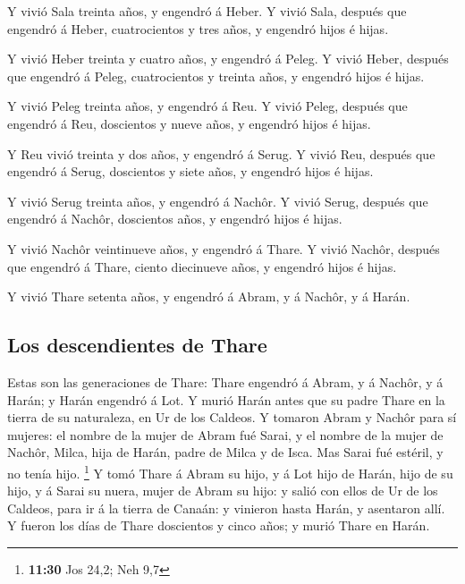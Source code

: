  Y vivió Sala treinta años, y engendró á Heber.
 Y vivió Sala, después que engendró á Heber,
cuatrocientos y tres años, y engendró hijos é hijas.

 Y vivió Heber treinta y cuatro años, y engendró á Peleg.
 Y vivió Heber, después que engendró á Peleg,
cuatrocientos y treinta años, y engendró hijos é hijas.

 Y vivió Peleg treinta años, y engendró á Reu.
 Y vivió Peleg, después que engendró á Reu, doscientos y
nueve años, y engendró hijos é hijas.

 Y Reu vivió treinta y dos años, y engendró á Serug.
 Y vivió Reu, después que engendró á Serug, doscientos y
siete años, y engendró hijos é hijas.

 Y vivió Serug treinta años, y engendró á Nachôr.
 Y vivió Serug, después que engendró á Nachôr, doscientos
años, y engendró hijos é hijas.

 Y vivió Nachôr veintinueve años, y engendró á Thare.
 Y vivió Nachôr, después que engendró á Thare, ciento
diecinueve años, y engendró hijos é hijas.

 Y vivió Thare setenta años, y engendró á Abram, y á
Nachôr, y á Harán.

\hypertarget{los-descendientes-de-thare}{%
\subsection{Los descendientes de
Thare}\label{los-descendientes-de-thare}}

 Estas son las generaciones de Thare: Thare engendró á
Abram, y á Nachôr, y á Harán; y Harán engendró á Lot.  Y
murió Harán antes que su padre Thare en la tierra de su naturaleza, en
Ur de los Caldeos.  Y tomaron Abram y Nachôr para sí
mujeres: el nombre de la mujer de Abram fué Sarai, y el nombre de la
mujer de Nachôr, Milca, hija de Harán, padre de Milca y de Isca.
 Mas Sarai fué estéril, y no tenía hijo. \footnote{\textbf{11:30}
  Jos 24,2; Neh 9,7}  Y tomó Thare á Abram su hijo, y á
Lot hijo de Harán, hijo de su hijo, y á Sarai su nuera, mujer de Abram
su hijo: y salió con ellos de Ur de los Caldeos, para ir á la tierra de
Canaán: y vinieron hasta Harán, y asentaron allí.  Y
fueron los días de Thare doscientos y cinco años; y murió Thare en
Harán.

